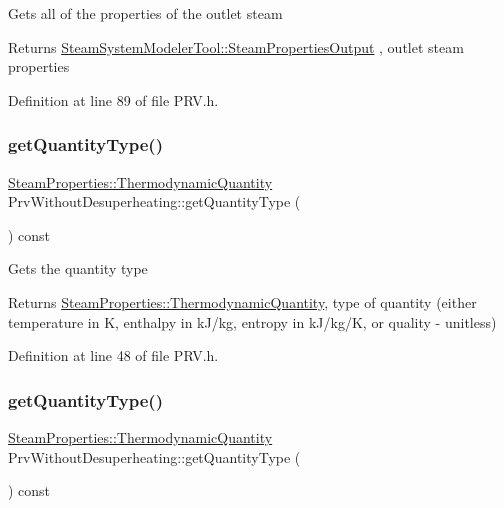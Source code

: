 Gets all of the properties of the outlet steam \begin{DoxyReturn}{Returns}
\hyperlink{struct_steam_system_modeler_tool_1_1_steam_properties_output}{Steam\+System\+Modeler\+Tool\+::\+Steam\+Properties\+Output} , outlet steam properties 
\end{DoxyReturn}


Definition at line 89 of file P\+R\+V.\+h.

\mbox{\label{class_prv_without_desuperheating_ad465c855f0c7271110ed2cb2ebccf081}} 
\subsubsection{\texorpdfstring{get\+Quantity\+Type()}{getQuantityType()}\hspace{0.1cm}{\footnotesize\ttfamily [1/3]}}
{\footnotesize\ttfamily \hyperlink{class_steam_properties_ae0294bedf7d178c2d8fb6aed0f62fbff}{Steam\+Properties\+::\+Thermodynamic\+Quantity} Prv\+Without\+Desuperheating\+::get\+Quantity\+Type (\begin{DoxyParamCaption}{ }\end{DoxyParamCaption}) const\hspace{0.3cm}{\ttfamily [inline]}}

Gets the quantity type

\begin{DoxyReturn}{Returns}
\hyperlink{class_steam_properties_ae0294bedf7d178c2d8fb6aed0f62fbff}{Steam\+Properties\+::\+Thermodynamic\+Quantity}, type of quantity (either temperature in K, enthalpy in k\+J/kg, entropy in k\+J/kg/K, or quality -\/ unitless) 
\end{DoxyReturn}


Definition at line 48 of file P\+R\+V.\+h.

\mbox{\label{class_prv_without_desuperheating_ad465c855f0c7271110ed2cb2ebccf081}} 
\subsubsection{\texorpdfstring{get\+Quantity\+Type()}{getQuantityType()}\hspace{0.1cm}{\footnotesize\ttfamily [2/3]}}
{\footnotesize\ttfamily \hyperlink{class_steam_properties_ae0294bedf7d178c2d8fb6aed0f62fbff}{Steam\+Properties\+::\+Thermodynamic\+Quantity} Prv\+Without\+Desuperheating\+::get\+Quantity\+Type (\begin{DoxyParamCaption}{ }\end{DoxyParamCaption}) const\hspace{0.3cm}{\ttfamily [inline]}}

